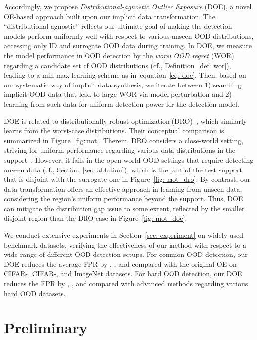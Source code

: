 \documentclass{article} \usepackage{iclr2022_conference,times}
\def\eqref#1{equation~\ref{#1}}
\begin{document}
Accordingly, we propose \emph{Distributional-agnostic Outlier Exposure} (DOE), a novel OE-based approach built upon our implicit data transformation. The ``distributional-agnostic'' reflects our ultimate goal of making the detection models perform uniformly well with respect to various unseen OOD distributions, accessing only ID and surrogate OOD data during training. In DOE, we measure the model performance in OOD detection by the \emph{worst OOD regret} (WOR) regarding a candidate set of OOD distributions (cf., Definition~\ref{def: wor}), leading to a min-max learning scheme as in~\eqref{eq: doe}. Then, based on our systematic way of implicit data synthesis, we iterate between 1) searching implicit OOD data that lead to large WOR via model perturbation and 2) learning from such data for uniform detection power for the detection model. 

DOE is related to distributionally robust optimization (DRO)~\citep{rahimian2019distributionally}, which similarly learns from the worst-case distributions. Their conceptual comparison is summarized in Figure~\ref{fig:mot}. Therein, DRO considers a close-world setting, striving for uniform performance regarding various data distributions in the support~\citep{sagawa2019distributionally}. However, it fails in the open-world OOD settings that require detecting unseen data (cf., Section~\ref{sec: ablation}), which is the part of the test support that is disjoint with the surrogate one in Figure~\ref{fig: mot_dro}. By contrast, our data transformation offers an effective approach in learning from unseen data, considering the region's uniform performance beyond the support. Thus, DOE can mitigate the distribution gap issue to some extent, reflected by the smaller disjoint region than the DRO case in Figure~\ref{fig: mot_doe}. 







We conduct extensive experiments in Section~\ref{sec: experiment} on widely used benchmark datasets, verifying the effectiveness of our method with respect to a wide range of different OOD detection setups. For common OOD detection, our DOE reduces the average FPR by {, , and } compared with the original OE on CIFAR-, CIFAR-, and ImageNet datasets. For hard OOD detection, our DOE reduces the FPR by , , and  compared with advanced methods regarding various hard OOD datasets. 




\section{Preliminary} \label{sec: related work}
\end{document}
